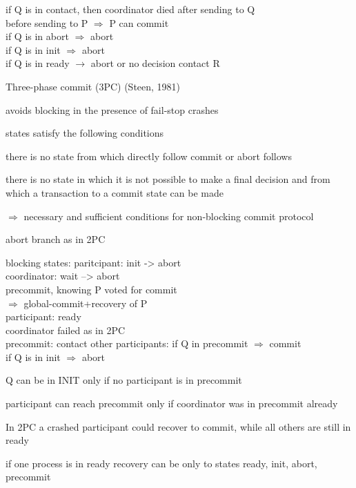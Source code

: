 \documentclass[ngerman,a4paper]{report}
\begin{document}
\begin{compactitem}
\begin{compactitem}
	if Q is in contact, then coordinator died after sending to Q\\
	before sending to P $\Rightarrow$ P can commit\\
	if Q is in abort $\Rightarrow$ abort\\
	if Q is in init $\Rightarrow$ abort\\
	if Q is in ready $\rightarrow$ abort or no decision contact R\\
	\end{compactitem}
	\item Three-phase commit (3PC) (Steen, 1981)\\
	\begin{compactitem}
		\item avoids blocking in the presence of fail-stop crashes
		\item states satisfy the following conditions\\
		\begin{compactenum}
			\item there is no state from which directly follow commit or abort follows
			\item there is no state in which it is not possible to make a final decision and from which a transaction to a commit state can be made
		\end{compactenum}
		$\Rightarrow$ necessary and sufficient conditions for non-blocking commit protocol
		\item abort branch as in 2PC
		\item blocking states: paritcipant: init -> abort\\
		coordinator: wait --> abort\\
		precommit, knowing P voted for commit\\
		$\Rightarrow$ global-commit+recovery of P\\
		participant: ready\\
			coordinator failed as in 2PC\\
			precommit: contact other participants: if Q in precommit $\Rightarrow$ commit\\
			if Q is in init $\Rightarrow$ abort
		\item Q can be in INIT only if no participant is in precommit
		\item participant can reach precommit only if coordinator was in precommit already
		\item In 2PC a crashed participant could recover to commit, while all others are still in ready
		\item if one process is in ready recovery can be only to states ready, init, abort, precommit\\

\end{compactitem}
\end{compactitem}
\end{document}
